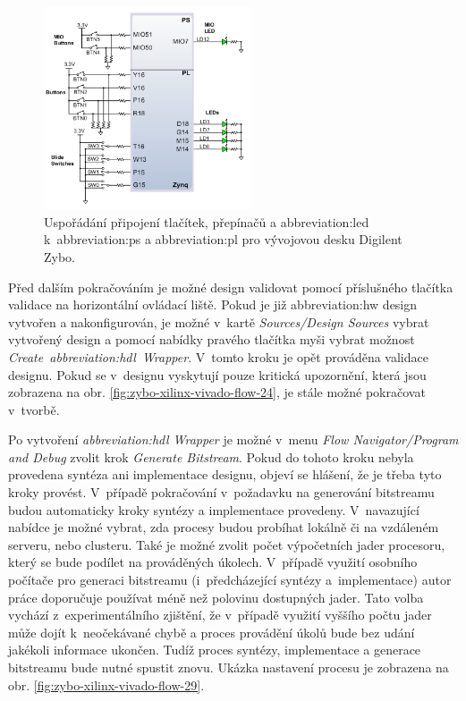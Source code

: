 \documentclass[a4paper, twoside, 11pt]{article}
\newcommand{\fbar}{\FloatBarrier}
\begin{document}
\begin{appendices}
		\begin{figure}[htbp!]
			\centering
			\includegraphics[width=0.55\textwidth]{src/png/digilent-zybo-ps-pl-gpio.png}
			\caption{Uspořádání připojení tlačítek, přepínačů a \gls{abbreviation:led} k~\gls{abbreviation:ps} a \gls{abbreviation:pl} pro vývojovou desku Digilent Zybo. \cite{digilent-zybo-reference-manual}}
			\label{fig:digilent-zybo-ps-pl-gpio}
		\end{figure}

		\fbar
		Před dalším pokračováním je možné design validovat pomocí příslušného tlačítka validace na horizontální ovládací liště. Pokud je již \gls{abbreviation:hw} design vytvořen a nakonfigurován, je možné v~kartě \textit{Sources/Design Sources} vybrat vytvořený design a pomocí nabídky pravého tlačítka myši vybrat možnost \textit{Create~\gls{abbreviation:hdl}~Wrapper}. V~tomto kroku je opět prováděna validace designu. Pokud se v~designu vyskytují pouze kritická upozornění, která jsou zobrazena na obr. \ref{fig:zybo-xilinx-vivado-flow-24}, je stále možné pokračovat v~tvorbě.\par
		Po vytvoření \textit{\gls{abbreviation:hdl} Wrapper} je možné v~menu \textit{Flow Navigator/Program and Debug} zvolit krok \textit{Generate Bitstream}. Pokud do tohoto kroku nebyla provedena syntéza ani implementace designu, objeví se hlášení, že je třeba tyto kroky provést. V~případě pokračování v~požadavku na generování bitstreamu budou automaticky kroky syntézy a implementace provedeny. V~navazující nabídce je možné vybrat, zda procesy budou probíhat lokálně či na vzdáleném serveru, nebo clusteru. Také je možné zvolit počet výpočetních jader procesoru, který se bude podílet na prováděných úkolech. V~případě využití osobního počítače pro generaci bitstreamu (i~předcházející syntézy a~implementace) autor práce doporučuje používat méně než polovinu dostupných jader. Tato volba vychází z~experimentálního zjištění, že v~případě využití vyššího počtu jader může dojít k~neočekávané chybě a proces provádění úkolů bude bez udání jakékoli informace ukončen. Tudíž proces syntézy, implementace a generace bitstreamu bude nutné spustit znovu. Ukázka nastavení procesu je zobrazena na obr. \ref{fig:zybo-xilinx-vivado-flow-29}.\par



\end{appendices}
\end{document}
